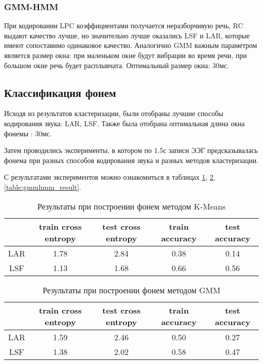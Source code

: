 \documentclass[a4paper,14pt]{extarticle}
\begin{document}
\subsubsection{GMM-HMM}
При кодировании LPC коэффициентами получается неразборчивую речь, RC выдают качество лучше, но значительно лучше оказались LSF и LAR, которые имеют сопоставимо одинаковое качество. Аналогично GMM важным параметром является размер окна: при маленьком окне будут вибрации во время речи, при большом окне речь будет расплывчата. Оптимальный размер окна: 30мс.

\subsection{Классификация фонем}

Исходя из результатов кластеризации, были отобраны лучшие способы кодирования звука: LAR, LSF.
Также была отобрана оптимальная длина окна фонемы : 30мс.

Затем проводились эксперименты, в котором по 1.5с записи ЭЭГ предсказывалась фонема при разных способов кодирования звука и разных методов кластеризации.

С результатами экспериментов можно ознакомиться в таблицах \ref{table:kmeans_result}, \ref{table:gmm_result}, \ref{table:gmmhmm_result}.

\begin{table}[!htbp]
	\caption{Результаты при построении фонем методом K-Means}
	\label{table:kmeans_result}
	\centering
	\begin{tabular}{|| c | c | c | c | c ||}
		\hline
		 & train cross entropy & test cross entropy & train accuracy & test accuracy \\
		\hline\hline
		LAR & 1.78 & 2.84 & 0.38 & 0.14\\
		LSF & 1.13 & 1.68 & 0.66 & 0.56\\
		\hline
	\end{tabular}	
\end{table}

\begin{table}[!htbp]
	\caption{Результаты при построении фонем методом GMM}
	\label{table:gmm_result}
	\centering
	\begin{tabular}{|| c | c | c | c | c ||}
		\hline
		 & train cross entropy & test cross entropy & train accuracy & test accuracy \\
		\hline\hline
		LAR & 1.59 & 2.46 & 0.50 & 0.27\\
		LSF & 1.38 & 2.02 & 0.58 & 0.47\\
		\hline
	\end{tabular}	
\end{table}
\end{document}
